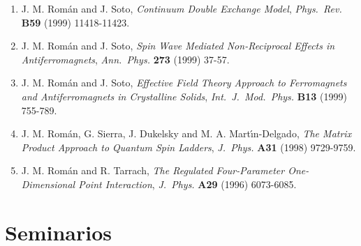 \documentclass{article}
\begin{document}
\begin{enumerate}
\item J. M. Rom\'an and J. Soto, 
{\it Continuum Double Exchange Model},
{\it Phys.~Rev.} {\bf B59} (1999) 11418-11423.

\item J. M. Rom\'an and J. Soto, 
{\it Spin Wave Mediated Non-Reciprocal Effects in Antiferromagnets}, 
{\it Ann.~Phys.} {\bf 273} (1999) 37-57.

\item J. M. Rom\'an and J. Soto, 
{\it Effective Field Theory Approach to Ferromagnets and Antiferromagnets 
in Crystalline Solids}, 
{\it Int.~J.~Mod.~Phys.} {\bf B13} (1999) 755-789.

\item J. M. Rom\'an, G. Sierra, J. Dukelsky and M. A. Mart\'{\i}n-Delgado, 
{\it The Matrix Product Approach to Quantum Spin Ladders}, 
{\it J.~Phys.} {\bf A31} (1998) 9729-9759.

\item J. M. Rom\'an and R. Tarrach, 
{\it The Regulated Four-Parameter One-Dimensional Point Interaction}, 
{\it J.~Phys.} {\bf A29} (1996) 6073-6085.
\end{enumerate}



\section*{Seminarios}
\end{document}
